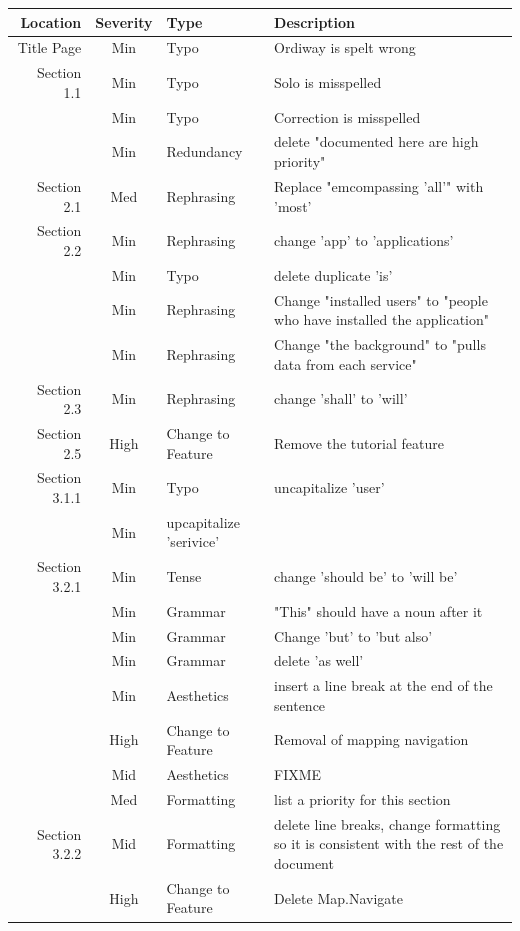 \documentclass[pdftex,12pt,letter]{article}
\begin{document}
\begin{flushleft}
{\small 
\begin{tabular}{|r|c|l|p{6cm}|}
    \hline
Location & Severity & Type & Description \\
  \hline
  Title Page & Min & Typo & Ordiway is spelt wrong \\
    \hline
  Section 1.1 & Min & Typo & Solo is misspelled \\
   & Min & Typo & Correction is misspelled \\
   & Min & Redundancy  &  delete "documented here are high priority" \\
  \hline
  Section 2.1 & Med & Rephrasing & Replace "emcompassing 'all'" with 'most'\\
  \hline
  Section 2.2 & Min & Rephrasing & change 'app' to 'applications'\\
    & Min & Typo & delete duplicate 'is'\\
    & Min & Rephrasing & Change "installed users" to "people who have installed the application"\\
    & Min & Rephrasing & Change "the background" to "pulls data from each service"\\
\hline
	Section 2.3 & Min & Rephrasing & change 'shall' to 'will'\\
	\hline
	Section 2.5 & High & Change to Feature & Remove the tutorial feature\\
	\hline
Section 3.1.1 & Min & Typo & uncapitalize 'user'\\
 & Min & upcapitalize 'serivice'\\
\hline
Section 3.2.1 & Min & Tense & change 'should be' to 'will be'\\
& Min & Grammar & "This" should have a noun after it\\
& Min & Grammar & Change 'but' to 'but also'\\
& Min & Grammar & delete 'as well'\\
& Min & Aesthetics & insert a line break at the end of the sentence\\
& High & Change to Feature & Removal of mapping navigation\\
& Mid & Aesthetics & FIXME \\ 
& Med & Formatting & list a priority for this section\\
\hline
Section 3.2.2 & Mid & Formatting & delete line breaks, change formatting so it is consistent with the rest of the document\\
 & High & Change to Feature & Delete Map.Navigate\\
\hline



\end{tabular}}
\end{flushleft}
\end{document}
